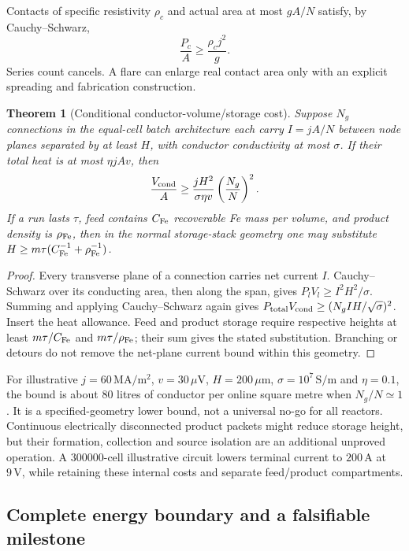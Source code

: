 \documentclass[11pt]{article}
\newtheorem{theorem}{Theorem}
\begin{document}
Contacts of specific resistivity $\rho_c$ and actual area at most $gA/N$
satisfy, by Cauchy--Schwarz,
\begin{equation}\label{eq:contact}
 \frac{P_c}{A}\ge\frac{\rho_cj^2}{g}.
\end{equation}
Series count cancels. A flare can enlarge real contact area only with an
explicit spreading and fabrication construction.

\begin{theorem}[Conditional conductor-volume/storage cost]\label{thm:wire}
Suppose $N_g$ connections in the equal-cell batch architecture each carry
$I=jA/N$ between node planes separated by at least $H$, with conductor
conductivity at most $\sigma$. If their total heat is at most $\eta jAv$, then
\[
 \frac{V_{\rm cond}}{A}\ge
 \frac{jH^2}{\sigma\eta v}\left(\frac{N_g}{N}\right)^2.
\]
If a run lasts $\tau$, feed contains $C_{\rm Fe}$ recoverable Fe mass per
volume, and product density is $\rho_{\rm Fe}$, then in the normal storage-stack
geometry one may substitute
$H\ge m\tau(C_{\rm Fe}^{-1}+\rho_{\rm Fe}^{-1})$.
\end{theorem}
\begin{proof}
Every transverse plane of a connection carries net current $I$.
Cauchy--Schwarz over its conducting area, then along the span, gives
$P_lV_l\ge I^2H^2/\sigma$. Summing and applying Cauchy--Schwarz again gives
$P_{\rm total}V_{\rm cond}\ge(N_gIH/\sqrt\sigma)^2$.
Insert the heat allowance. Feed and product storage require respective
heights at least $m\tau/C_{\rm Fe}$ and $m\tau/\rho_{\rm Fe}$; their sum gives
the stated substitution. Branching or detours do not remove the net-plane
current bound within this geometry.
\end{proof}

For illustrative $j=60\,\mathrm{MA/m^2}$, $v=30\,\mu\mathrm V$,
$H=200\,\mu\mathrm m$, $\sigma=10^7\,\mathrm{S/m}$ and $\eta=0.1$, the bound
is about 80 litres of conductor per online square metre when $N_g/N\simeq1$.
It is a specified-geometry lower bound, not a universal no-go for all reactors.
Continuous electrically disconnected product packets might reduce storage
height, but their formation, collection and source isolation are an additional
unproved operation. A $300000$-cell illustrative circuit lowers terminal
current to $200\,\mathrm A$ at $9\,\mathrm V$, while retaining these internal
costs and separate feed/product compartments.

\subsection{Complete energy boundary and a falsifiable milestone}
\end{document}
